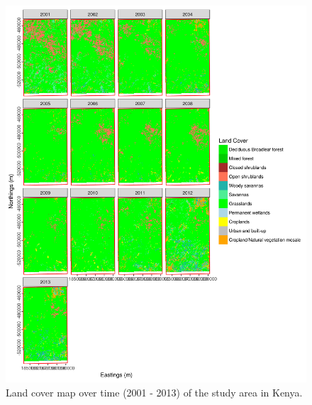 \documentclass[12pt,a4paper, twoside, english]{article}
\begin{document}
\begin{figure}[H]
  \centering
  \includegraphics[width=\textwidth]{figures/Landcover_KEN.png}
  \caption[Land cover map of Laikipia]{Land cover map over time (2001 - 2013) of the study area in Kenya.}
  \label{fig:mlc_ken}
\end{figure}


\end{document}
